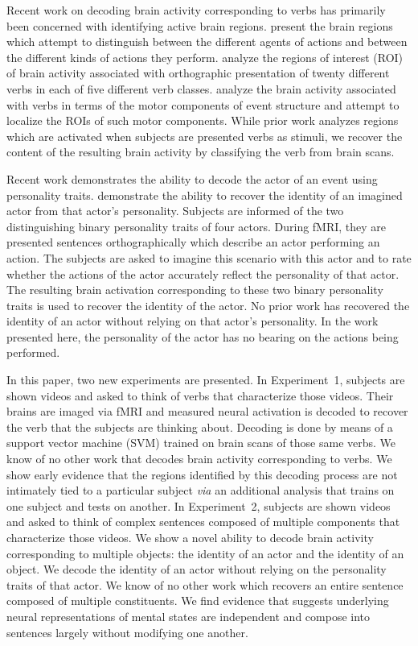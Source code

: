 Recent work on decoding brain activity corresponding to verbs has primarily
been concerned with identifying active brain regions.
%
\citet{kable2006} present the brain regions which attempt to distinguish
between the different agents of actions and between the different kinds of
actions they perform.
%
\citet{kemmerer2008} analyze the regions of interest (ROI) of brain activity
associated with orthographic presentation of twenty different verbs in each of
five different verb classes.
%
\citet{kemmerer2010} analyze the brain activity associated with verbs in
terms of the motor components of event structure and attempt to localize the
ROIs of such motor components.
%
While prior work analyzes regions which are activated when subjects are
presented verbs as stimuli, we recover the content of the resulting brain
activity by classifying the verb from brain scans.

Recent work demonstrates the ability to decode the actor of an event using
personality traits.
%
\citet{Hassabis-etal-2013a} demonstrate the ability to recover the identity of
an imagined actor from that actor's personality.
%
Subjects are informed of the two distinguishing binary personality traits of
four actors.
%
During fMRI, they are presented sentences orthographically which describe an
actor performing an action.
%
The subjects are asked to imagine this scenario with this actor and to rate
whether the actions of the actor accurately reflect the personality of that
actor.
%
The resulting brain activation corresponding to these two binary personality
traits is used to recover the identity of the actor.
%
No prior work has recovered the identity of an actor without relying on that
actor's personality.
%
In the work presented here, the personality of the actor has no bearing on the
actions being performed.

In this paper, two new experiments are presented.
%
In Experiment~1, subjects are shown videos and asked to think of verbs that
characterize those videos.
%
Their brains are imaged via fMRI and measured neural activation is
decoded to recover the verb that the subjects are thinking about.
%
Decoding is done by means of a support vector machine (SVM) trained on brain
scans of those same verbs.
%
We know of no other work that decodes brain activity corresponding to verbs.
%
We show early evidence that the regions identified by this decoding process are
not intimately tied to a particular subject \emph{via} an additional analysis
that trains on one subject and tests on another.
%
In Experiment~2, subjects are shown videos and asked to think of complex
sentences composed of multiple components that characterize those videos.
%
We show a novel ability to decode brain activity corresponding to multiple
objects: the identity of an actor and the identity of an object.
%
We decode the identity of an actor without relying on the personality traits of
that actor.
%
We know of no other work which recovers an entire sentence composed of multiple
constituents.
%
We find evidence that suggests underlying neural representations of mental
states are independent and compose into sentences largely without modifying one
another.

